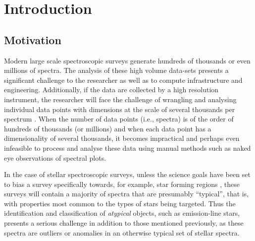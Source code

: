 \chapter{Introduction}
\section{Motivation}
Modern large scale spectroscopic surveys generate hundreds of thousands or even millions of spectra. The analysis of these high volume data-sets presents a significant challenge to the researcher as well as to compute infrastructure and engineering. Additionally, if the data are collected by a high resolution instrument, the researcher will face the challenge of wrangling and analysing individual data points with dimensions at the scale of several thousands per spectrum \citep[e.g.,][]{buder2021galah+}. When the number of data points (i.e., spectra) is of the order of hundreds of thousands (or millions) and when each data point has a dimensionality of several thousands, it becomes impractical and perhaps even infeasible to process and analyse these data using manual methods such as naked eye observations of spectral plots. 

In the case of stellar spectroscopic surveys, unless the science goals have been set to bias a survey specifically towards, for example, star forming regions  \citep{traven2015gaia}, these surveys will contain a majority of spectra that are presumably ``typical'', that is, with properties most common to the types of stars being targeted. Thus the identification and classification of {\em atypical} objects, such as emission-line stars, presents a serious challenge in addition to those mentioned previously, as these spectra are outliers or anomalies in an otherwise typical set of stellar spectra.

